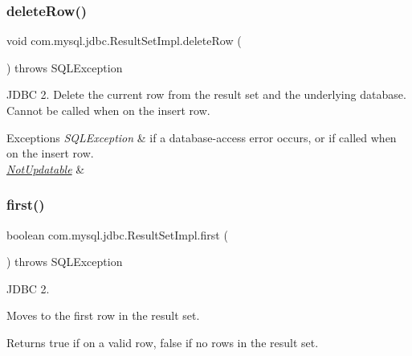 \subsubsection{\texorpdfstring{delete\+Row()}{deleteRow()}}
{\footnotesize\ttfamily void com.\+mysql.\+jdbc.\+Result\+Set\+Impl.\+delete\+Row (\begin{DoxyParamCaption}{ }\end{DoxyParamCaption}) throws S\+Q\+L\+Exception}

J\+D\+BC 2. Delete the current row from the result set and the underlying database. Cannot be called when on the insert row.


\begin{DoxyExceptions}{Exceptions}
{\em S\+Q\+L\+Exception} & if a database-\/access error occurs, or if called when on the insert row. \\
\hline
{\em \mbox{\hyperlink{classcom_1_1mysql_1_1jdbc_1_1_not_updatable}{Not\+Updatable}}} & \\
\hline
\end{DoxyExceptions}
\mbox{\label{classcom_1_1mysql_1_1jdbc_1_1_result_set_impl_ad95952bb64306d825909c08271282c6f}} 
\subsubsection{\texorpdfstring{first()}{first()}}
{\footnotesize\ttfamily boolean com.\+mysql.\+jdbc.\+Result\+Set\+Impl.\+first (\begin{DoxyParamCaption}{ }\end{DoxyParamCaption}) throws S\+Q\+L\+Exception}

J\+D\+BC 2.

Moves to the first row in the result set. 

\begin{DoxyReturn}{Returns}
true if on a valid row, false if no rows in the result set.
\end{DoxyReturn}

